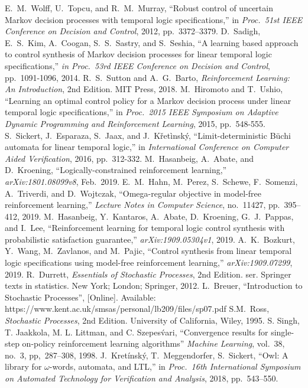 \documentclass[a4j,12pt,oneside,openany,english]{jsbook}
\begin{document}
\begin{thebibliography}{99}
  E.\ M.\ Wolff, U.\ Topcu, and R.\ M.\ Murray,
  ``Robust control of uncertain Markov decision processes with temporal logic specifications,''
  in \textit{Proc.\ 51st IEEE Conference on Decision and Control}, 2012, pp.\ 3372--3379.
  D.\ Sadigh, E.\ S.\ Kim, A.\ Coogan, S.\ S.\ Sastry, and S.\ Seshia,
  ``A learning based approach to control synthesis of Markov decision processes for linear temporal logic specifications,''
  \textit{in Proc.\ 53rd IEEE Conference on Decision and Control}, pp.\ 1091-1096, 2014.
  R.\ S.\ Sutton and A.\ G.\ Barto,
  \textit{Reinforcement Learning: An Introduction}, 2nd Edition.
  MIT Press, 2018.
  M.\ Hiromoto and T.\ Ushio,
  ``Learning an optimal control policy for a Markov decision process under linear temporal logic specifications,''
  in \textit{Proc.\ 2015 IEEE Symposium on Adaptive Dynamic Programming and Reinforcement Learning}, 2015, pp.\ 548-555.
  S.\ Sickert, J.\ Esparaza, S.\ Jaax, and J.\ K\v{r}et\`{i}nsk\'{y},
  ``Limit-deterministic B\"{u}chi automata for linear temporal logic,''
   in \textit{International Conference on Computer Aided Verification}, 2016, pp.\ 312-332.
  M.\ Hasanbeig, A.\ Abate, and D.\ Kroening,
  ``Logically-constrained reinforcement learning,'' \textit{arXiv:1801.08099v8}, Feb.\ 2019.
  E.\ M.\ Hahn, M.\ Perez, S.\ Schewe, F.\ Somenzi, A.\ Triverdi, and D.\ Wojtczak,
  ``Omega-regular objective in model-free reinforcement learning,''
  \textit{Lecture Notes in Computer Science}, no.\ 11427, pp.\ 395--412, 2019.
  M.\ Hasanbeig, Y.\ Kantaros, A.\ Abate, D.\ Kroening, G.\ J.\ Pappas, and I.\ Lee,
  ``Reinforcement learning for temporal logic control synthesis with probabilistic satisfaction guarantee,''
  \textit{arXiv:1909.05304v1}, 2019.
  A.\ K.\ Bozkurt, Y.\ Wang, M.\ Zavlanos, and M.\ Pajic,
  ``Control synthesis from linear temporal logic specifications using model-free reinforcement learning,''
  \textit{arXiv:1909.07299}, 2019.
  R.\ Durrett,
  \textit{Essentials of Stochastic Processes}, 2nd Edition. ser. Springer texts in statistics. New York; London; Springer, 2012.
  L.\ Breuer,
  ``Introduction to Stochastic Processes'', [Online]. Available: https://www.kent.ac.uk/smsas/personal/lb209/files/sp07.pdf
  S.M.\ Ross,
  \textit{Stochastic Processes}, 2nd Edition. University of California, Wiley, 1995.
  S. Singh, T. Jaakkola, M. L. Littman, and C. Szepes\'{v}ari,
  ``Convergence results for single-step on-policy reinforcement learning algorithms'' \textit{Machine Learning},
  vol.~38, no.~3, pp,~287--308, 1998.
  J.~Kretínsk\'{y}, T.~Meggendorfer, S.~Sickert, ``Owl: A library for $\omega$-words, automata,
  and LTL,'' in \textit{Proc.~16th International Symposium on Automated Technology for Verification and Analysis}, 2018,  pp.~543–550.
\end{thebibliography}
%
%
\end{document}
